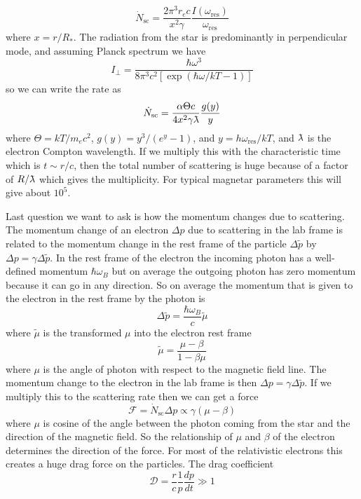 \documentclass[letterpaper, 11pt]{article}
\newcommand{\lambdabar}{{\mkern0.75mu\mathchar '26\mkern -9.75mu\lambda}}
\numberwithin{equation}{section}
\numberwithin{figure}{section}
\begin{document}
\begin{equation}
    \label{eq:62}
    \dot{N}_\mathrm{sc} = \frac{2\pi^3r_ec}{x^2\gamma}\frac{I(\omega_\mathrm{res})}{\omega_\mathrm{res}}
\end{equation}
where $x = r/R_{*}$. The radiation from the star is predominantly in perpendicular mode, and assuming Planck spectrum we have
\begin{equation}
    \label{eq:63}
    I_{\perp} = \frac{\hbar\omega^3}{8\pi^3c^2 \left[ \exp \left( \hbar\omega/kT - 1 \right) \right]}
\end{equation}
so we can write the rate as
\begin{equation}
    \label{eq:64}
    \dot{N}_\mathrm{sc} = \frac{\alpha\Theta c}{4x^2\gamma \lambdabar}\frac{g(y)}{y}
\end{equation}
where $\Theta = kT/m_ec^2$, $g(y) = y^3/(e^y - 1)$, and $y = h\omega_\mathrm{res}/kT$, and $\lambdabar$ is the electron Compton wavelength. If we multiply this with the characteristic time which is $t \sim r/c$, then the total number of scattering is huge because of a factor of $R/\lambdabar$ which gives the multiplicity. For typical magnetar parameters this will give about $10^5$.

Last question we want to ask is how the momentum changes due to scattering. The momentum change of an electron $\Delta p$ due to scattering in the lab frame is related to the momentum change in the rest frame of the particle $\Delta \tilde{p}$ by $\Delta p = \gamma \Delta \tilde{p}$. In the rest frame of the electron the incoming photon has a well-defined momentum $\hbar\omega_B$ but on average the outgoing photon has zero momentum because it can go in any direction. So on average the momentum that is given to the electron in the rest frame by the photon is
\begin{equation}
    \label{eq:65}
    \Delta \tilde{p} = \frac{\hbar\omega_B}{c}\tilde{\mu}
\end{equation}
where $\tilde{\mu}$ is the transformed $\mu$ into the electron rest frame
\begin{equation}
    \label{eq:68}
    \tilde{\mu} = \frac{\mu - \beta}{1 - \beta\mu}
\end{equation}
where $\mu$ is the angle of photon with respect to the magnetic field line. The momentum change to the electron in the lab frame is then $\Delta p = \gamma \Delta \tilde{p}$. If we multiply this to the scattering rate then we can get a force
\begin{equation}
    \label{eq:66}
    \mathcal{F} = \dot{N}_\mathrm{sc}\Delta p \propto \gamma(\mu - \beta)
\end{equation}
where $\mu$ is cosine of the angle between the photon coming from the star and the direction of the magnetic field. So the relationship of $\mu$ and $\beta$ of the electron determines the direction of the force. For most of the relativistic electrons this creates a huge drag force on the particles. The drag coefficient
\begin{equation}
    \label{eq:67}
    \mathcal{D} = \frac{r}{c}\frac{1}{p}\frac{dp}{dt} \gg 1
\end{equation}
\end{document}
